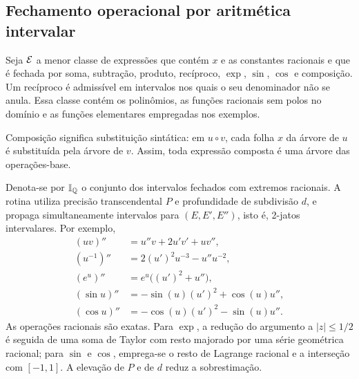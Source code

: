 \subsection{Fechamento operacional por aritmética intervalar}
Seja $\mathcal E$ a menor classe de expressões que contém $x$ e as constantes racionais e que é fechada por soma, subtração, produto, recíproco, $\exp$, $\sin$, $\cos$ e composição. Um recíproco é admissível em intervalos nos quais o seu denominador não se anula. Essa classe contém os polinômios, as funções racionais sem polos no domínio e as funções elementares empregadas nos exemplos.

Composição significa substituição sintática: em $u\circ v$, cada folha $x$ da árvore de $u$ é substituída pela árvore de $v$. Assim, toda expressão composta é uma árvore das operações-base.

Denota-se por $\mathbb I_{\mathbb Q}$ o conjunto dos intervalos fechados com extremos racionais. A rotina
utiliza precisão transcendental $P$ e profundidade de subdivisão $d$, e propaga simultaneamente intervalos para $(E,E',E'')$, isto é, 2-jatos intervalares. Por exemplo,
\begin{align*}
(uv)''&=u''v+2u'v'+uv'',\\
(u^{-1})''&=2(u')^2u^{-3}-u''u^{-2},\\
(e^u)''&=e^u\bigl((u')^2+u''\bigr),\\
(\sin u)''&=-\sin(u)(u')^2+\cos(u)u'',\\
(\cos u)''&=-\cos(u)(u')^2-\sin(u)u''.
\end{align*}
As operações racionais são exatas. Para $\exp$, a redução do argumento a $|z|\le1/2$ é seguida de uma soma de Taylor com resto majorado por uma série geométrica racional; para $\sin$ e $\cos$, emprega-se o resto de Lagrange racional e a interseção com $[-1,1]$. A elevação de $P$ e de $d$ reduz a sobrestimação.

